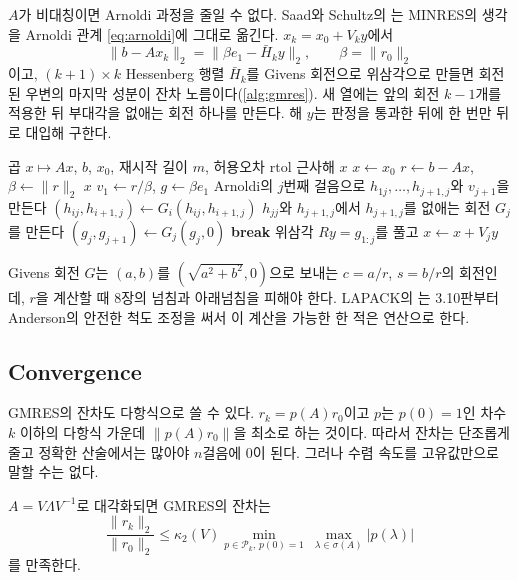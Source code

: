 $A$가 비대칭이면 Arnoldi 과정을 줄일 수 없다. Saad와 Schultz의 는 MINRES의 생각을 Arnoldi 관계 \eqref{eq:arnoldi}에 그대로 옮긴다\cite{saad1986gmres}. $x_k=x_0+V_ky$에서
\[
\|b-Ax_k\|_2=\|\beta e_1-\bar H_ky\|_2,\qquad\beta=\|r_0\|_2
\]
이고, $(k+1)\times k$ Hessenberg 행렬 $\bar H_k$를 Givens 회전으로 위삼각으로 만들면 회전된 우변의 마지막 성분이 잔차 노름이다(\cref{alg:gmres}). 새 열에는 앞의 회전 $k-1$개를 적용한 뒤 부대각을 없애는 회전 하나를 만든다. 해 $y$는 판정을 통과한 뒤에 한 번만 뒤로 대입해 구한다.

\begin{algorithm}[t]
\begin{algorithmic}[1]
\Require 곱 $x\mapsto Ax$, $b$, $x_0$, 재시작 길이 $m$, 허용오차 $\mathrm{rtol}$
\Ensure 근사해 $x$
\State $x\gets x_0$
\Loop
  \State $r\gets b-Ax$, $\beta\gets\|r\|_2$
   \Return $x$
  \EndIf
  \State $v_1\gets r/\beta$, $g\gets\beta e_1$
    \State Arnoldi의 $j$번째 걸음으로 $h_{1j},\dots,h_{j+1,j}$와 $v_{j+1}$을 만든다
      \State $(h_{ij},h_{i+1,j})\gets G_i(h_{ij},h_{i+1,j})$ 
    \EndFor
    \State $h_{jj}$와 $h_{j+1,j}$에서 $h_{j+1,j}$를 없애는 회전 $G_j$를 만든다
    \State $(g_j,g_{j+1})\gets G_j(g_j,0)$ 
     \textbf{break}
    \EndIf
  \EndFor
  \State 위삼각 $R y=g_{1:j}$를 풀고 $x\gets x+V_jy$
\EndLoop
\end{algorithmic}
\caption{재시작 GMRES($m$)}
\label{alg:gmres}
\end{algorithm}

Givens 회전 $G$는 $(a,b)$를 $(\sqrt{a^2+b^2},0)$으로 보내는 $c=a/r$, $s=b/r$의 회전인데, $r$을 계산할 때 8장의 넘침과 아래넘침을 피해야 한다. LAPACK의 는 3.10판부터 Anderson의 안전한 척도 조정을 써서 이 계산을 가능한 한 적은 연산으로 한다\cite{anderson2017safe}.

\subsection{Convergence}

GMRES의 잔차도 다항식으로 쓸 수 있다. $r_k=p(A)r_0$이고 $p$는 $p(0)=1$인 차수 $k$ 이하의 다항식 가운데 $\|p(A)r_0\|$을 최소로 하는 것이다. 따라서 잔차는 단조롭게 줄고 정확한 산술에서는 많아야 $n$걸음에 $0$이 된다. 그러나 수렴 속도를 고유값만으로 말할 수는 없다.

\begin{theorem}
\label{thm:gmres-diag}
$A=V\Lambda V^{-1}$로 대각화되면 GMRES의 잔차는
\[
\frac{\|r_k\|_2}{\|r_0\|_2}\le\kappa_2(V)\min_{p\in\mathcal P_k,\,p(0)=1}\ \max_{\lambda\in\sigma(A)}|p(\lambda)|
\]
를 만족한다.
\end{theorem}

